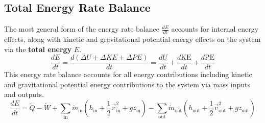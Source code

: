 \subsection{Total Energy Rate Balance}
The most general form of the energy rate balance $\frac{dE}{dt}$
accounts for internal energy effects, along with kinetic and gravitational potential energy effects on the system via the \textbf{total energy} $E$.
\begin{equation}
\frac{dE}{dt}=\frac{d (\Delta U + \Delta KE + \Delta PE)}{dt} = \frac{dU}{dt}+\frac{d\text{KE}}{dt}+\frac{d\text{PE}}{dt}
\end{equation}
This energy rate balance accounts for all energy contributions including kinetic and gravitational potential energy contributions to the system via mass inputs and outputs.
\begin{equation}
\label{eqn:ERateTotalGeneral}
\frac{dE}{dt}=\dot{Q}-\dot{W}
+\sum_{\text{in}}\dot{m}_\text{in}(h_\text{in}+\frac{1}{2}\vec{v}_\text{in}^2+gz_\text{in})
-\sum_{\text{out}}\dot{m}_\text{out}(h_\text{out}+\frac{1}{2}\vec{v}_\text{out}^2+gz_\text{out})
\end{equation}

